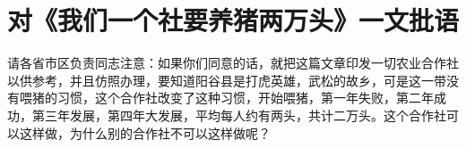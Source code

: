 \section[对《我们一个社要养猪两万头》一文批语（一九五九年十一月十九日）]{对《我们一个社要养猪两万头》一文批语}


请各省市区负责同志注意：如果你们同意的话，就把这篇文章印发一切农业合作社以供参考，并且仿照办理，要知道阳谷县是打虎英雄，武松的故乡，可是这一带没有喂猪的习惯，这个合作社改变了这种习惯，开始喂猪，第一年失败，第二年成功，第三年发展，第四年大发展，平均每人约有两头，共计二万头。这个合作社可以这样做，为什么别的合作社不可以这样做呢？


